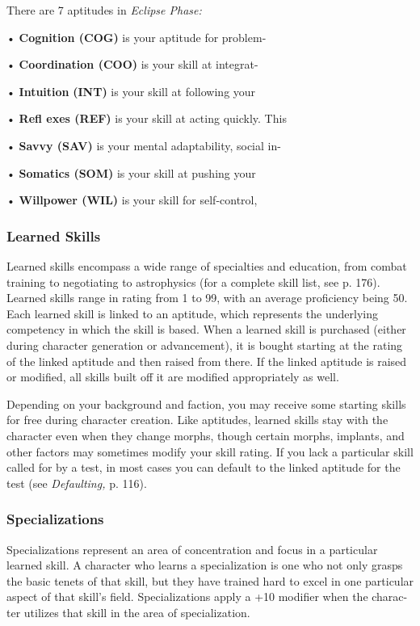 There are 7 aptitudes in \textit{Eclipse Phase:}

•  \textbf{Cognition (COG)} is your aptitude for problem-

•  \textbf{Coordination (COO)} is your skill at integrat-

•  \textbf{Intuition} \textbf{(INT)} is your skill at following your 

•  \textbf{Refl exes (REF)} is your skill at acting quickly. This 

•  \textbf{Savvy (SAV)} is your mental adaptability, social in-

•  \textbf{Somatics (SOM)} is your skill at pushing your 

•  \textbf{Willpower (WIL)} is your skill for self-control, 

\subsubsection{Learned Skills}

Learned skills encompass a wide range of specialties 
and education, from combat training to negotiating 
to astrophysics (for a complete skill list, see p. 176). 
Learned skills range in rating from 1 to 99, with an 
average proficiency being 50. Each learned skill is 
linked to an aptitude, which represents the underlying 
competency in which the skill is based. When a learned 
skill is purchased (either during character generation 
or advancement), it is bought starting at the rating of 
the linked aptitude and then raised from there. If the 
linked aptitude is raised or modified, all skills built off 
it are modified appropriately as well.

Depending on your background and faction, you 
may receive some starting skills for free during 
character creation. Like aptitudes, learned skills stay 
with the character even when they change morphs, 
though certain morphs, implants, and other factors 
may sometimes modify your skill rating. If you lack 
a particular skill called for by a test, in most cases 
you can default to the linked aptitude for the test (see 
\textit{Defaulting,} p. 116).

\subsubsection{Specializations}

Specializations represent an area of concentration and 
focus in a particular learned skill. A character who 
learns a specialization is one who not only grasps the 
basic tenets of that skill, but they have trained hard 
to excel in one particular aspect of that skill's field. 
Specializations apply a +10 modifier when the charac-
ter utilizes that skill in the area of specialization.

